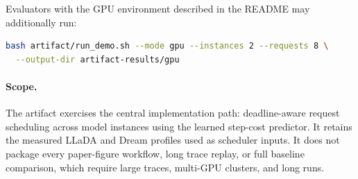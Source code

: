 Evaluators with the GPU environment described in the README may additionally
run:

\begin{lstlisting}[language=bash]
bash artifact/run_demo.sh --mode gpu --instances 2 --requests 8 \
  --output-dir artifact-results/gpu
\end{lstlisting}

\paragraph{Scope.}
The artifact exercises the central implementation path: deadline-aware request
scheduling across model instances using the learned step-cost predictor. It
retains the measured LLaDA and Dream profiles used as scheduler inputs. It does
not package every paper-figure workflow, long trace replay, or full baseline
comparison, which require large traces, multi-GPU clusters, and long runs.
